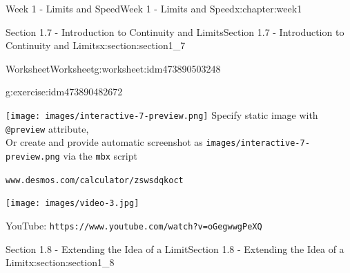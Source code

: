 \documentclass[oneside,10pt,]{book}
\newcommand{\mono}[1]{\texttt{#1}}
\numberwithin{equation}{section}
\newlength{\qrsize}
\newlength{\previewwidth}
\begin{document}
\begin{chapterptx}{Week 1 - Limits and Speed}{}{Week 1 - Limits and Speed}{}{}{x:chapter:week1}
\begin{sectionptx}{Section 1.7 - Introduction to Continuity and Limits}{}{Section 1.7 - Introduction to Continuity and Limits}{}{}{x:section:section1_7}
\begin{worksheet-subsection}{Worksheet}{}{Worksheet}{}{}{g:worksheet:idm473890503248}
\begin{divisionexercise}{3}{}{}{g:exercise:idm473890482672}
\begin{tcbraster}[raster columns=2, raster column skip=1pt, raster halign=center, raster force size=false, raster left skip=0pt, raster right skip=0pt]
\begin{tcolorbox}[previewstyle, width=\previewwidth]%
%
{\texttt{[image: images/interactive-7-preview.png]}}%
{\small{}Specify static image with \mono{@preview} attribute,\\Or create and provide automatic screenshot as \mono{images/interactive-7-preview.png} via the \mono{mbx} script}%
\end{tcolorbox}%
\begin{tcolorbox}[qrstyle]%
{\hypersetup{urlcolor=black}}%
\end{tcolorbox}%
\begin{tcolorbox}[captionstyle]%
\small \mono{www.desmos.com/calculator/zswsdqkoct}\end{tcolorbox}%
\end{tcbraster}%
%
\end{divisionexercise}%
\end{worksheet-subsection}
\restoregeometry
\setlength{\qrsize}{9em}
\setlength{\previewwidth}{\linewidth}
\addtolength{\previewwidth}{-\qrsize}
\begin{tcbraster}[raster columns=2, raster column skip=1pt, raster halign=center, raster force size=false, raster left skip=0pt, raster right skip=0pt]%
\begin{tcolorbox}[previewstyle, width=\previewwidth]%
\texttt{[image: images/video-3.jpg]}%
\end{tcolorbox}%
\begin{tcolorbox}[qrstyle]%
{\hypersetup{urlcolor=black}}%
\end{tcolorbox}%
\begin{tcolorbox}[captionstyle]%
\small YouTube: \mono{https://www.youtube.com/watch?v=oGegwwgPeXQ}\end{tcolorbox}%
\end{tcbraster}%
\end{sectionptx}
%
%
\typeout{************************************************}
\typeout{************************************************}
%
\begin{sectionptx}{Section 1.8 - Extending the Idea of a Limit}{}{Section 1.8 - Extending the Idea of a Limit}{}{}{x:section:section1_8}
\setlength{\qrsize}{9em}
\setlength{\previewwidth}{\linewidth}
\addtolength{\previewwidth}{-\qrsize}
\begin{tcbraster}[raster columns=2, raster column skip=1pt, raster halign=center, raster force size=false, raster left skip=0pt, raster right skip=0pt]%

\end{tcbraster}
\end{sectionptx}
\end{chapterptx}
\end{document}
